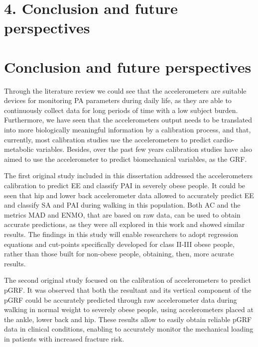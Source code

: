 \documentclass[12pt]{article}
\def\blankpage{%
      \clearpage%
      \thispagestyle{empty}%
      \addtocounter{page}{+0}%
      \null%
      \clearpage}
\begin{document}
\thispagestyle{empty}
\blankpage


\pagebreak

\section*{\vfill\raggedleft\bfseries 4. Conclusion and future perspectives}
\thispagestyle{empty} 
\blankpage

\section*{Conclusion and future perspectives}

Through the literature review we could see that the accelerometers are suitable devices for monitoring PA parameters during daily life, as they are able to continuously collect data for long periods of time with a low subject burden. Furthermore, we have seen that the accelerometers output needs to be translated into more biologically meaningful information by a calibration process, and that, currently, most calibration studies use the accelerometers to predict cardio-metabolic variables. Besides, over the past few years calibration studies have also aimed to use the accelerometer to predict biomechanical variables, as the GRF. 

The first original study included in this dissertation addressed the accelerometers calibration to predict EE and classify PAI in severely obese people. It could be seen that hip and lower back accelerometer data allowed to accurately predict EE and classify SA and PAI during walking in this population. Both AC and the metrics MAD and ENMO, that are based on raw data, can be used to obtain accurate predictions, as they were all explored in this work and showed similar results. The findings in this study will enable researchers to adopt regression equations and cut-points specifically developed for class II-III obese people, rather than those built for non-obese people, obtaining, then, more acurate results. 

The second original study focused on the calibration of accelerometers to predict pGRF. It was observed that both the resultant and its vertical component of the pGRF could be accurately predicted through raw accelerometer data during walking in normal weight to severely obese people, using accelerometers placed at the ankle, lower back and hip. These results allow to easily obtain reliable pGRF data in clinical conditions, enabling to accurately monitor the mechanical loading in patients with increased fracture risk.
\end{document}

